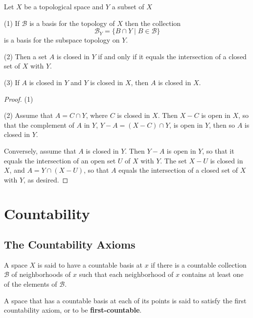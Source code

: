 \documentclass[12pt, a4paper, oneside]{book}
\begin{document}
\begin{theorem}
    Let $X$ be a topological space and $Y$ a subset of $X$

    (1) If $\mathscr{B}$ is a basis for the topology of $X$ then the collection
    \begin{equation*}
        \mathscr{B}_Y=\{B \cap Y \mid B \in \mathscr{B}\}
    \end{equation*}
    is a basis for the subspace topology on $Y$.

    (2) Then a set $A$ is closed in $Y$ if and only if it equals the intersection of a closed set of $X$ with $Y$.

    (3) If $A$ is closed in $Y$ and $Y$ is closed in $X$, then $A$ is closed in $X$.
    \begin{proof}
        (1)

        (2)
        Assume that $A=C \cap Y$, where $C$ is closed in $X$. Then $X-C$ is open in $X$, so that the complement of $A$ in $Y$, $Y-A=(X-C) \cap Y$, is open in $Y$, then so $A$ is closed in $Y$.

        Conversely, assume that $A$ is closed in $Y$. Then $Y-A$ is open in $Y$, so that it equals the intersection of an open set $U$ of $X$ with $Y$. The set $X-U$ is closed in $X$, and $A=Y \cap(X-U)$, so that $A$ equals the intersection of a closed set of $X$ with $Y$, as desired.
    \end{proof}
\end{theorem}



\chapter{Countability} %

\section{The Countability Axioms} %
\begin{definition}
    A space $X$ is said to have a countable basis at $x$ if there is a countable collection $\mathscr{B}$ of neighborhoods of $x$ such that each neighborhood of $x$ contains at least one of the elements of $\mathscr{B}$.

    A space that has a countable basis at each of its points is said to satisfy the first countability axiom, or to be \textbf{first-countable}.
\end{definition}
\end{document}
